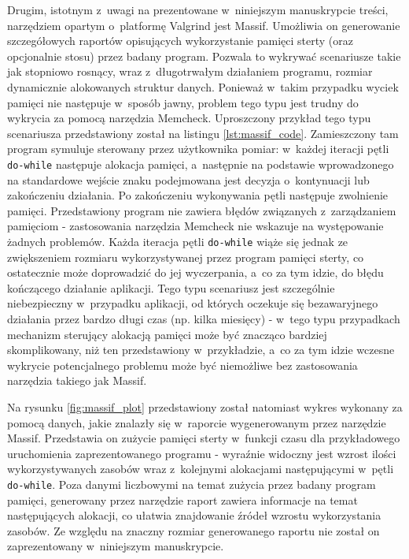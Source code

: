 Drugim, istotnym z~uwagi na prezentowane w~niniejszym manuskrypcie treści, narzędziem opartym o~platformę Valgrind jest Massif. Umożliwia on generowanie szczegółowych raportów opisujących wykorzystanie pamięci sterty (oraz opcjonalnie stosu) przez badany program. Pozwala to wykrywać scenariusze takie jak stopniowo rosnący, wraz z~długotrwałym działaniem programu, rozmiar dynamicznie alokowanych struktur danych. Ponieważ w~takim przypadku wyciek pamięci nie następuje w~sposób jawny, problem tego typu jest trudny do wykrycia za pomocą narzędzia Memcheck. Uproszczony przykład tego typu scenariusza przedstawiony został na listingu \ref{lst:massif_code}. Zamieszczony tam program symuluje sterowany przez użytkownika pomiar: w~każdej iteracji pętli \lstinline{do-while} następuje alokacja pamięci, a~następnie na podstawie wprowadzonego na standardowe wejście znaku podejmowana jest decyzja o~kontynuacji lub zakończeniu działania. Po zakończeniu wykonywania pętli następuje zwolnienie pamięci. Przedstawiony program nie zawiera błędów związanych z~zarządzaniem pamięciom - zastosowania narzędzia Memcheck nie wskazuje na występowanie żadnych problemów. Każda iteracja pętli \lstinline{do-while} wiąże się jednak ze zwiększeniem rozmiaru wykorzystywanej przez program pamięci sterty, co ostatecznie może doprowadzić do jej wyczerpania, a~co za tym idzie, do błędu kończącego działanie aplikacji. Tego typu scenariusz jest szczególnie niebezpieczny w~przypadku aplikacji, od których oczekuje się bezawaryjnego działania przez bardzo długi czas (np. kilka miesięcy) - w~tego typu przypadkach mechanizm sterujący alokacją pamięci może być znacząco bardziej skomplikowany, niż ten przedstawiony w~przykładzie, a~co za tym idzie wczesne wykrycie potencjalnego problemu może być niemożliwe bez zastosowania narzędzia takiego jak Massif.



Na rysunku \ref{fig:massif_plot} przedstawiony został natomiast wykres wykonany za pomocą danych, jakie znalazły się w~raporcie wygenerowanym przez narzędzie Massif. Przedstawia on zużycie pamięci sterty w~funkcji czasu dla przykładowego uruchomienia zaprezentowanego programu - wyraźnie widoczny jest wzrost ilości wykorzystywanych zasobów wraz z~kolejnymi alokacjami następującymi w~pętli \lstinline{do-while}. Poza danymi liczbowymi na temat zużycia przez badany program pamięci, generowany przez narzędzie raport zawiera informacje na temat następujących alokacji, co ułatwia znajdowanie źródeł wzrostu wykorzystania zasobów. Ze względu na znaczny rozmiar generowanego raportu nie został on zaprezentowany w~niniejszym manuskrypcie.

